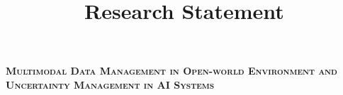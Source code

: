 \documentclass[9pt]{article}
\title{
    \vspace{-3em}
    \textbf{Research Statement} \hfill \href{https://ksolaiman.github.io/}{\textit{\Name}}
    \vspace{-2.5em}
}
\date{}
\begin{document}
\pagestyle{plain}

\renewcommand{\medskip}{\smallskip}

% 
\begin{center}
    \textsc{\large{\textbf{Multimodal Data Management in Open-world Environment and Uncertainty Management in AI Systems}}} %
\end{center}

\setlength{\parindent}{0pt}
%  
% 
\end{document}
